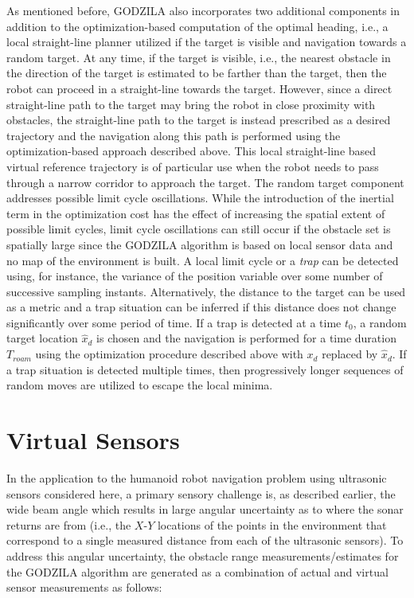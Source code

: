 As mentioned before, GODZILA also incorporates two additional components in addition to the optimization-based computation of the optimal heading, i.e., a local straight-line planner utilized if the target is visible and navigation towards a random target.
At any time, if the target is visible, i.e., the nearest obstacle in the direction of the target is estimated to be farther than the target, then the robot can proceed in a straight-line towards the target. However, since a direct straight-line path to the target may bring the robot in close proximity with obstacles, the straight-line path to the target is instead prescribed as a desired trajectory and the navigation along this path is performed using the optimization-based approach described above. This local
straight-line based virtual reference trajectory is of particular use when the robot needs to pass through a narrow corridor to approach the target. The random target component addresses possible limit cycle oscillations. While the introduction of the inertial term in the optimization cost has the effect of increasing the spatial extent of possible limit cycles, limit cycle oscillations can still occur if the obstacle set is spatially large since the GODZILA algorithm is based on local sensor data and no map of the environment is built. A local limit cycle or a {\em trap} can be detected using, for instance, the variance of the position variable over some number of successive sampling instants.  Alternatively, the distance to the target can be used as a metric and a trap situation can be inferred if this distance does not change significantly over some period of time. If a trap is detected at a time $t_0$, a random target location $\hat x_d$ is chosen and the navigation is performed for a time duration $T_{roam}$ using the optimization procedure described above with $x_d$ replaced by $\hat x_d$. If a trap situation is detected multiple times, then progressively longer sequences of random moves are utilized to escape the local minima.

\section{Virtual Sensors} 
In the application to the humanoid robot navigation problem using ultrasonic sensors considered here, a primary sensory challenge is, as described earlier, the wide beam angle which results in large angular uncertainty as to where the sonar returns are from
(i.e., the $X$-$Y$ locations of the points in the environment that correspond to a single measured distance from each of the ultrasonic sensors). To address this angular uncertainty, the obstacle range measurements/estimates for the GODZILA algorithm are generated as a combination of actual and virtual sensor measurements as follows:

